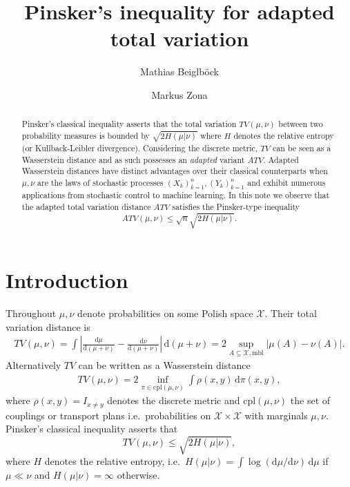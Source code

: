 \documentclass[10pt, A4paper]{amsart}
\author{Mathias Beiglb\"ock}
\author{Markus Zona}
\date{}
\theoremstyle{definition}
\newcommand{\X}{\mathcal X}
\newcommand{\cpl}{\mathrm{cpl}}
\newcommand{\dd}{\mathrm{d}}
\numberwithin{equation}{section}
\begin{document}
\title[Adapted Pinsker]{Pinsker's inequality for adapted total variation}



\begin{abstract} Pinsker's classical inequality asserts that the total variation $TV(\mu, \nu)$ between two probability measures is bounded by $\sqrt{ 2H(\mu|\nu)}$ where $H$ denotes the relative entropy (or Kullback-Leibler divergence). 
Considering the discrete metric, $TV$ can be seen as a Wasserstein distance and as such possesses an \emph{adapted} variant $ATV$. Adapted Wasserstein distances have distinct advantages over their classical counterparts when $\mu, \nu$ are the laws of stochastic processes $(X_k)_{k=1}^n, (Y_k)_{k=1}^n$ and exhibit numerous applications from stochastic control to machine learning. In this note we observe that the adapted total variation distance $ATV$ satisfies the Pinsker-type inequality
$$ ATV(\mu, \nu)\leq \sqrt{n} \sqrt{2 H(\mu|\nu)}.$$
\end{abstract}





\maketitle

\section{Introduction}%
Throughout $\mu, \nu$ denote probabilities on some Polish space $\X$. Their total variation distance 
is 
\begin{align*}
TV(\mu,\nu)= %
\int{\textstyle  \left| \frac{\dd \mu}{\dd(\mu+\nu)} - \frac{\dd \nu}{\dd(\mu+\nu)}   \right| }\, \dd (\mu+\nu) = 2 \sup_{A\subseteq \X, \text{mbl}} |\mu(A)-\nu(A)|.
\end{align*}
Alternatively $TV$ can be written as a Wasserstein distance
\begin{align*}\label{eq:TVviaOT}
TV(\mu, \nu)= 2 \inf_{\pi\in \cpl(\mu, \nu)} \int \rho(x,y)\, \dd\pi(x,y),    
\end{align*}
where $\rho(x,y)=I_{x\neq y}$ denotes the discrete metric and $\cpl(\mu, \nu)$ the set of couplings or transport plans  i.e.\ probabilities on $\X\times \X$ with marginals $\mu, \nu$. 
Pinsker's classical inequality asserts that \[TV(\mu, \nu)\leq \sqrt{2H(\mu|\nu)},\] where $H$ denotes the relative entropy, i.e.\ $H(\mu|\nu) =\int\log(\dd \mu / \dd \nu)\, \dd\mu$ if $\mu\ll \nu$ and $H(\mu|\nu)= \infty $ otherwise. 
\end{document}
